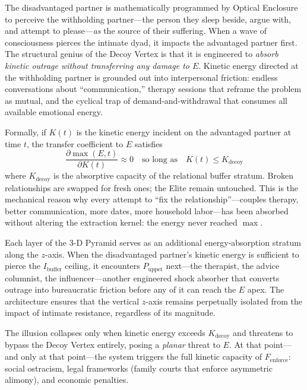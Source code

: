 \documentclass[12pt,openany]{book}
\numberwithin{equation}{chapter}
\begin{document}
The disadvantaged partner is mathematically programmed by Optical Enclosure to perceive the withholding partner---the person they sleep beside, argue with, and attempt to please---\textit{as} the source of their suffering. When a wave of consciousness pierces the intimate dyad, it impacts the advantaged partner first. The structural genius of the Decoy Vertex is that it is engineered to \textit{absorb kinetic outrage without transferring any damage to $E$}. Kinetic energy directed at the withholding partner is grounded out into interpersonal friction: endless conversations about ``communication,'' therapy sessions that reframe the problem as mutual, and the cyclical trap of demand-and-withdrawal that consumes all available emotional energy.

Formally, if $K(t)$ is the kinetic energy incident on the advantaged partner at time $t$, the transfer coefficient to $E$ satisfies
\begin{equation}\label{eq:decoy-transfer-coefficient}
\frac{\partial \max(E, t)}{\partial K(t)} \approx 0 \quad \text{so long as} \quad K(t) \leq K_{\text{decoy}}
\end{equation}
where $K_{\text{decoy}}$ is the absorptive capacity of the relational buffer stratum. Broken relationships are swapped for fresh ones; the Elite remain untouched. This is the mechanical reason why every attempt to ``fix the relationship''---couples therapy, better communication, more dates, more household labor---has been absorbed without altering the extraction kernel: the energy never reached $\max$.

Each layer of the 3-D Pyramid serves as an additional energy-absorption stratum along the $z$-axis. When the disadvantaged partner's kinetic energy is sufficient to pierce the $I_{\text{buffer}}$ ceiling, it encounters $P_{\text{uppet}}$ next---the therapist, the advice columnist, the influencer---another engineered shock absorber that converts outrage into bureaucratic friction before any of it can reach the $E$ apex. The architecture ensures that the vertical $z$-axis remains perpetually isolated from the impact of intimate resistance, regardless of its magnitude.

The illusion collapses only when kinetic energy exceeds $K_{\text{decoy}}$ and threatens to bypass the Decoy Vertex entirely, posing a \textit{planar} threat to $E$. At that point---and only at that point---the system triggers the full kinetic capacity of $F_{\text{enforce}}$: social ostracism, legal frameworks (family courts that enforce asymmetric alimony), and economic penalties.
\end{document}
